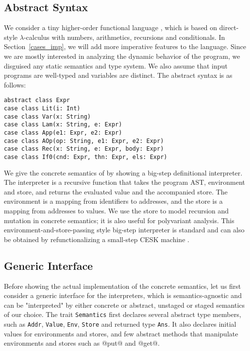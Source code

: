 \subsection{Abstract Syntax} \label{bg_lang}

We consider a tiny higher-order functional language \TLang, which is based on
direct-style $\lambda$-calculus with numbers, arithmetics, recursions and
conditionals. In Section~\ref{cases_imp}, we will add more imperative features
to the language. Since we are mostly interested in analyzing the dynamic
behavior of the program, we disguised any static semantics and type system. We
also assume that input programs are well-typed and variables are distinct. The
abstract syntax is as follows:

\begin{lstlisting}
abstract class Expr
case class Lit(i: Int)
case class Var(x: String)
case class Lam(x: String, e: Expr)
case class App(e1: Expr, e2: Expr)
case class AOp(op: String, e1: Expr, e2: Expr)
case class Rec(x: String, e: Expr, body: Expr)
case class If0(cnd: Expr, thn: Expr, els: Expr)
\end{lstlisting}

We give the concrete semantics of \TLang by showing a big-step definitional
interpreter. The interpreter is a recursive function that takes the program AST,
environment and store, and returns the evaluated value and the accompanied
store. The environment is a mapping from identifiers to addresses, and the store
is a mapping from addresses to values. We use the store to model recursion and
mutation in concrete semantics; it is also useful for polyvariant analysis. This
environment-and-store-passing style big-step interpreter is standard and can
also be obtained by refunctionalizing \cite{DBLP:conf/ppdp/AgerBDM03,
Wei:2018:RAA:3243631.3236800} a small-step CESK machine
\cite{DBLP:conf/popl/FelleisenF87}.

\subsection{Generic Interface}

Before showing the actual implementation of the concrete semantics, let us first
consider a generic interface for the interpreters, which is semantics-agnostic
and can be "interpreted" by either concrete or abstract, unstaged or staged
semantics of our choice. The trait \texttt{Semantics} first declares several
abstract type members, such as \texttt{Addr}, \texttt{Value}, \texttt{Env},
\texttt{Store} and returned type \texttt{Ans}. It also declares initial values
for environments and stores, and few abstract methods that manipulate
environments and stores such as @put@ and @get@.

